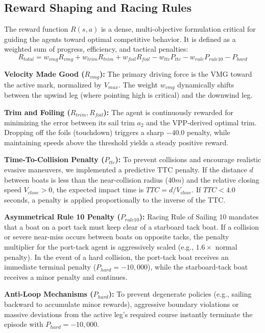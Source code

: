 \documentclass{article}
\begin{document}
\subsection{Reward Shaping and Racing Rules}
The reward function $R(s, a)$ is a dense, multi-objective formulation critical for guiding the agents toward optimal competitive behavior. It is defined as a weighted sum of progress, efficiency, and tactical penalties:
\begin{equation}
R_{total} = w_{vmg}R_{vmg} + w_{trim}R_{trim} + w_{foil}R_{foil} - w_{ttc}P_{ttc} - w_{rule}P_{rule10} - P_{hard}
\end{equation}

\textbf{Velocity Made Good ($R_{vmg}$):} The primary driving force is the VMG toward the active mark, normalized by $V_{max}$. The weight $w_{vmg}$ dynamically shifts between the upwind leg (where pointing high is critical) and the downwind leg.

\textbf{Trim and Foiling ($R_{trim}, R_{foil}$):} The agent is continuously rewarded for minimizing the error between its sail trim $a_2$ and the VPP-derived optimal trim. Dropping off the foils (touchdown) triggers a sharp $-40.0$ penalty, while maintaining speeds above the threshold yields a steady positive reward.

\textbf{Time-To-Collision Penalty ($P_{ttc}$):} To prevent collisions and encourage realistic evasive maneuvers, we implemented a predictive TTC penalty. If the distance $d$ between boats is less than the near-collision radius ($40m$) and the relative closing speed $V_{close} > 0$, the expected impact time is $TTC = d / V_{close}$. If $TTC < 4.0$ seconds, a penalty is applied proportionally to the inverse of the TTC.

\textbf{Asymmetrical Rule 10 Penalty ($P_{rule10}$):} Racing Rule of Sailing 10 mandates that a boat on a port tack must keep clear of a starboard tack boat. If a collision or severe near-miss occurs between boats on opposite tacks, the penalty multiplier for the port-tack agent is aggressively scaled (e.g., $1.6\times$ normal penalty). In the event of a hard collision, the port-tack boat receives an immediate terminal penalty ($P_{hard} = -10,000$), while the starboard-tack boat receives a minor penalty and continues.

\textbf{Anti-Loop Mechanisms ($P_{hard}$):} To prevent degenerate policies (e.g., sailing backward to accumulate minor rewards), aggressive boundary violations or massive deviations from the active leg's required course instantly terminate the episode with $P_{hard} = -10,000$.
\end{document}
